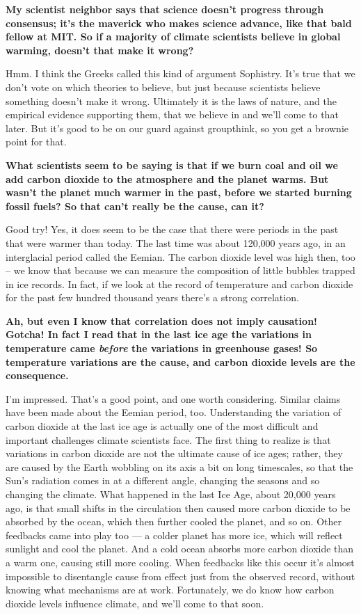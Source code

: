 \documentclass[11pt]{article}
\begin{document}
\textbf{\color{navy} My scientist neighbor says that science doesn't progress through
consensus; it's the maverick who makes science advance, like that bald
fellow at MIT. So if a majority of climate scientists believe in global
warming, doesn't that make it wrong?}

Hmm. I think the Greeks called this kind of argument Sophistry. It's
true that we don't vote on which theories to believe, but just because
scientists believe something doesn't make it wrong. Ultimately it is the
laws of nature, and the empirical evidence supporting them, that we
believe in and we'll come to that later. But it's good to be on our
guard against groupthink, so you get a brownie point for that.

\textbf{\color{navy} What scientists seem to be saying is that if we burn coal and
oil we add carbon dioxide to the atmosphere and the planet warms. But
wasn't the planet much warmer in the past, before we started burning
fossil fuels? So that can't really be the cause, can it?}

Good try! Yes, it does seem to be the case that there were periods in
the past that were warmer than today. The last time was about 120,000
years ago, in an interglacial period called the Eemian. The carbon
dioxide level was high then, too -- we know that because we can measure
the composition of little bubbles trapped in ice records. In fact, if we
look at the record of temperature and carbon dioxide for the past few
hundred thousand years there's a strong correlation.

\textbf{\color{navy} Ah, but even I know that correlation does not imply causation!
Gotcha! In fact I read that in the last ice age the variations in
temperature came \emph{before} the variations in greenhouse gases! So
temperature variations are the cause, and carbon dioxide levels are the
consequence.}

I'm impressed. That's a good point, and one worth considering. Similar claims have been made about the Eemian period, too. Understanding the variation of carbon dioxide at the last ice age is actually one of the most difficult and important challenges climate scientists face. The first thing to realize is that variations in carbon dioxide are not the ultimate cause of ice ages; rather, they are caused by the Earth wobbling on its axis a bit on long timescales, so that the Sun's radiation comes in at a different angle, changing the seasons and so changing the climate. What happened in the last Ice Age, about 20,000 years ago, is that small shifts in the circulation then caused more carbon dioxide to be absorbed by the ocean, which then further cooled the planet, and so on. Other feedbacks came into play too --- a colder planet has more ice, which will reflect sunlight and cool the planet. And a cold ocean absorbs more carbon dioxide than a warm one, causing still more cooling.  When feedbacks like this occur it's almost impossible to disentangle cause from effect just from the observed record, without knowing what mechanisms are at work. Fortunately, we do know how carbon dioxide levels influence climate, and we'll come to that soon.
\end{document}

